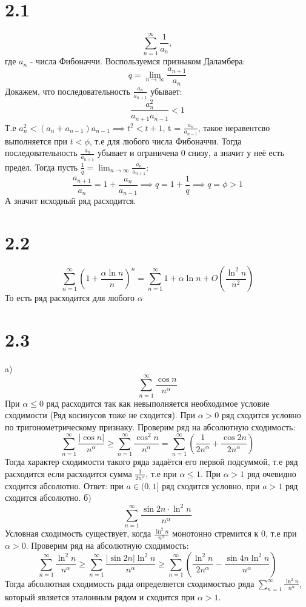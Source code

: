 \documentclass[12pt]{article}
\begin{document}
\section{2.1}
\[
    \sum_{n=1}^{\infty} \frac{1}{a_n},
\]
где $a_n$ - числа Фибоначчи. Воспользуемся признаком Даламбера:
\[
    q = \lim_{n \to \infty} \frac{a_{n+1} }{a_{n}}
\] 
Докажем, что последовательность $\frac{a_n}{a_{n+1} }$ убывает: 
\[
    \frac{a_n^2 }{a_{n+1} a_{n-1}} < 1 
\]
Т.е $a_n^2 < (a_n + a_{n-1} ) a_{n-1} \implies t^2 < t + 1$, t = $\frac{a_n}{a_{n-1} }$, такое неравентсво выполняется при $t < \phi$, т.е 
для любого числа Фибоначчи. Тогда последовательность $\frac{a_n}{a_{n+1} }$ убывает и ограничена 0 снизу, а значит у неё есть предел. Тогда 
пусть $\frac{1}{q} = \lim_{n \to \infty} \frac{a_n}{a_{n+1}}$:
\[
    \frac{a_{n+1} }{a_n} = 1 + \frac{a_n}{a_{n-1} } \implies q = 1 + \frac{1}{q} \implies q = \phi > 1
\]
А значит исходный ряд расходится. 
\section{2.2}
\[
    \sum_{n=1}^{\infty} \left( 1 + \frac{\alpha \ln n}{n} \right)^n = 
    \sum_{n=1}^{\infty} 1 + \alpha \ln n + O(\frac{\ln ^2 n}{n^2})
\]
То есть ряд расходится для любого $\alpha$ 
\section{2.3}
a)
\[
    \sum_{n=1}^{\infty} \frac{\cos n}{n^\alpha }
\]
При $\alpha \leq 0$ ряд расходится так как невыполняется необходимое условие сходимости (Ряд косинусов тоже не сходится). 
При $\alpha > 0$ ряд сходится условно по тригонометрическому признаку.
Проверим ряд на абсолютную сходимость: 
\[
    \sum_{n=1}^{\infty} \frac{\vert \cos n \vert }{n^\alpha} \geq  \sum_{n=1}^{\infty} \frac{\cos^2 n}{n^\alpha} = 
    \sum_{n=1}^{\infty} \left( \frac{1}{2n^\alpha } + \frac{\cos 2n}{2n^\alpha} \right) 
\]
Тогда характер сходимости такого ряда задаётся его первой подсуммой, т.е ряд расходится если расходится сумма 
$\frac{1}{2n^\alpha }$, т.е при $\alpha \leq 1$. При $\alpha > 1$ ряд очевидно сходится абсолютно.
Ответ: при $a \in (0, 1]$ ряд сходится условно, при $a > 1$ ряд сходится абсолютно.  
б) 
\[
    \sum_{n=1}^{\infty} \frac{\sin 2n \cdot \ln ^2 n}{n^\alpha}
\]
Условная сходимость существует, когда $\frac{\ln^2 n}{n^\alpha }$ монотонно стремится к 0, т.е при $\alpha > 0$.
Проверим ряд на абсолютную сходимость: 
\[
    \sum_{n=1}^{\infty} \frac{\ln^2 n}{n^\alpha } \geq \sum_{n=1}^{\infty} \frac{\vert \sin 2n \vert \ln^2 n}{n^\alpha} \geq \sum_{n=1}^{\infty} \left( \frac{\ln^2 n}{2n^\alpha } - \frac{\sin 4n \ln^2 n}{n^\alpha} \right) 
\]
Тогда абсолютная сходимость ряда определяется сходимостью ряда $\sum_{n=1}^{\infty} \frac{\ln^2 n}{n^\alpha }$, который является эталонным рядом и сходится при $\alpha > 1$.  
\end{document}
